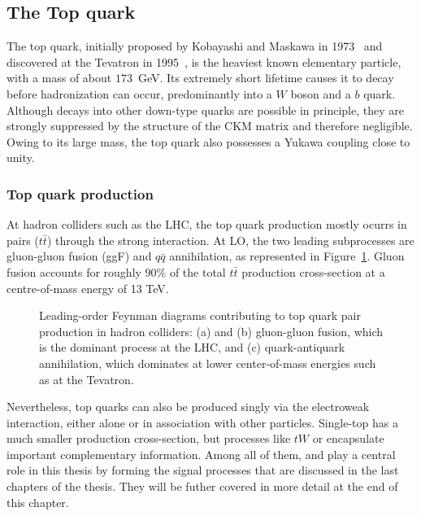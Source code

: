 \subsection{The Top quark}
\label{sec:top_quark}

The top quark, initially proposed by Kobayashi and Maskawa in 1973~\cite{10.1143/PTP.49.652} and discovered at the Tevatron in 1995~\cite{PhysRevLett.74.2626,PhysRevLett.74.2632}, is the heaviest known elementary particle, with a mass of about $173$~GeV. Its extremely short lifetime causes it to decay before hadronization can occur, predominantly into a $W$ boson and a $b$ quark. Although decays into other down-type quarks are possible in principle, they are strongly suppressed by the structure of the CKM matrix and therefore negligible. Owing to its large mass, the top quark also possesses a Yukawa coupling close to unity.

\subsubsection*{Top quark production}
\label{subsec:top_quark_prod}
At hadron colliders such as the LHC, the top quark production mostly ocurrs in pairs ($t\bar{t}$) through the strong interaction. At LO, the two leading subprocesses are gluon-gluon fusion (ggF) and $q\bar{q}$ annihilation, as represented in Figure~\ref{fig:tt-production}. Gluon fusion accounts for roughly $90\%$ of the total $t\bar{t}$ production cross-section at a centre-of-mass energy of 13 TeV.
\begin{figure}[htbp]
    \centering
    \hfill
    \hfill
    \caption{Leading-order Feynman diagrams contributing to top quark pair production in hadron colliders: (a) and (b) gluon-gluon fusion, which is the dominant process at the LHC, and (c) quark-antiquark annihilation, which dominates at lower center-of-mass energies such as at the Tevatron.}
    \label{fig:tt-production}
\end{figure}


Nevertheless, top quarks can also be produced singly via the electroweak interaction, either alone or in association with other particles. Single-top has a much smaller production cross-section, but processes like $tW$ or \tH encapsulate important complementary information.
Among all of them, \tH and \ttH play a central role in this thesis by forming the signal processes that are discussed in the last chapters of the thesis. They will be futher covered in more detail at the end of this chapter.

